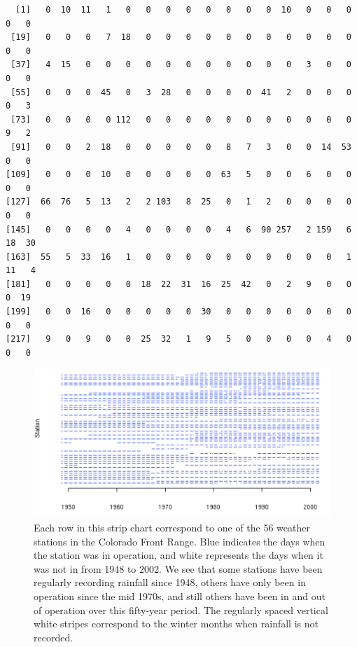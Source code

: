 \begin{table}
{\footnotesize
\begin{verbatim}
  [1]   0  10  11   1   0   0   0   0   0   0   0   0  10   0   0   0   0   0
 [19]   0   0   0   7  18   0   0   0   0   0   0   0   0   0   0   0   0   0
 [37]   4  15   0   0   0   0   0   0   0   0   0   0   0   3   0   0   0   0
 [55]   0   0   0  45   0   3  28   0   0   0   0  41   2   0   0   0   0   3
 [73]   0   0   0   0 112   0   0   0   0   0   0   0   0   0   0   0   9   2
 [91]   0   0   2  18   0   0   0   0   0   8   7   3   0   0  14  53   0   0
[109]   0   0   0  10   0   0   0   0   0  63   5   0   0   6   0   0   0   0
[127]  66  76   5  13   2   2 103   8  25   0   1   2   0   0   0   0   0   0
[145]   0   0   0   0   4   0   0   0   0   4   6  90 257   2 159   6  18  30
[163]  55   5  33  16   1   0   0   0   0   0   0   0   0   0   0   1  11   4
[181]   0   0   0   0   0  18  22  31  16  25  42   0   2   9   0   0   0  19
[199]   0   0  16   0   0   0   0   0  30   0   0   0   0   0   0   0   0   0
[217]   9   0   9   0   0  25  32   1   9   5   0   0   0   0   4   0   0   0
\end{verbatim}
}
\caption{A few observations from daily rainfall, measured in 
  hundredths of an inch (e.g. 103 represents 1.03 inches), 
  on 9,838 days from 1948 to 2002 at one of the 56 weather stations 
  in the Colorado Front Range.  A zero indicates no rainfall for that
  day, whereas a day when the weather station is not in operation is left 
  out of the array of values.}
\label{fig:rainData}
\end{table}

\begin{center}
\begin{figure}
 \includegraphics[width=5.5in]{Introduction/images/rainImg/operatingStations.pdf}
 \caption{Each row in this strip chart correspond to one of the 56
   weather stations in the Colorado Front Range. Blue indicates the
   days when the station was in operation, and white represents the
   days when it was not in from 1948 to 2002.  We see that some
   stations have been regularly recording rainfall since 1948, others
   have only been in operation since the mid 1970s, and still others
   have been in and out of operation over this fifty-year period.  The
   regularly spaced vertical white stripes correspond to the winter
   months when rainfall is not recorded.}
\label{fig:rainMissing}
\end{figure}
\end{center}


